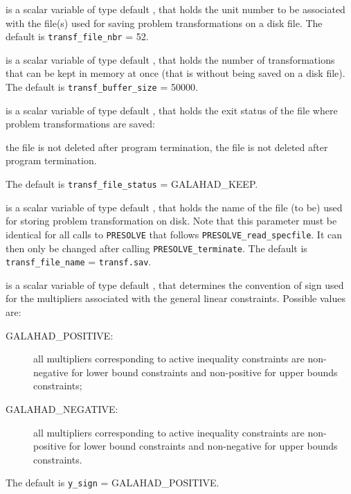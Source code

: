 \documentclass{galahad}
\newcommand{\packagename}{PRESOLVE}
\newcommand{\sym}{\sf\small}
\begin{document}
\begin{description}
 is a scalar variable of type default \integer, that
holds the unit number to be associated with the file(s) used
for saving problem transformations on a disk file.
The default is {\tt transf\_file\_nbr} = 52.

 is a scalar variable of type default \integer, that
holds the number of transformations that can be kept in memory
at once (that is without being saved on a disk file).
The default is {\tt transf\_buffer\_size} = 50000.

 is a scalar variable of type default \integer, that
holds the exit status of the file where problem transformations are saved:
\begin{description}
 the file is not deleted after program termination,
 the file is not deleted after program termination.
\end{description}
The default is {\tt transf\_file\_status} = {\sym GALAHAD\_KEEP}.

 is a scalar variable of type default \integer, that
holds the name of the file (to be) used for storing problem transformation on
disk. Note that this parameter must be identical for all calls to 
{\tt \packagename} that follows {\tt \packagename\_read\_specfile}. It can
then only be changed after calling {\tt \packagename\_terminate}.
The default is {\tt transf\_file\_name} = {\tt transf.sav}.

 is a scalar variable of type default \integer, that
determines the convention of sign used for the multipliers
associated with the general linear constraints. Possible values are:
\begin{description}
\item[\sym GALAHAD\_POSITIVE:] all multipliers corresponding to active 
                inequality constraints are non-negative for 
                lower bound constraints and non-positive for 
                upper bounds constraints;
\item[\sym GALAHAD\_NEGATIVE:] all multipliers corresponding to active 
                inequality constraints are non-positive for 
                lower bound constraints and non-negative for 
                upper bounds constraints.
\end{description}
The default is {\tt y\_sign} = {\sym GALAHAD\_POSITIVE}.


\end{description}
\end{document}
